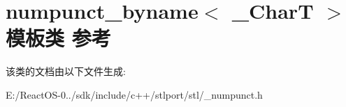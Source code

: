 \hypertarget{classnumpunct__byname}{}\section{numpunct\+\_\+byname$<$ \+\_\+\+CharT $>$ 模板类 参考}
\label{classnumpunct__byname}


该类的文档由以下文件生成\+:\begin{DoxyCompactItemize}
\item 
E\+:/\+React\+O\+S-\/0../sdk/include/c++/stlport/stl/\+\_\+numpunct.\+h\end{DoxyCompactItemize}
